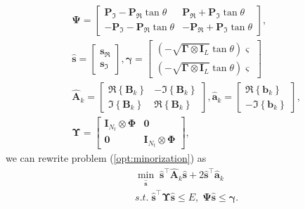 \documentclass[lettersize,journal]{IEEEtran}
\begin{document}
\begin{equation}
\begin{aligned}
    &\mathbf{\Psi} =
    \begin{bmatrix}
        \mathbf{P}_{\Im}-\mathbf{P}_{\Re}\tan\theta & \mathbf{P}_{\Re}+\mathbf{P}_{\Im}\tan\theta \\
        -\mathbf{P}_{\Im}-\mathbf{P}_{\Re}\tan\theta & -\mathbf{P}_{\Re}+\mathbf{P}_{\Im}\tan\theta
    \end{bmatrix}, \\
    &\hat{\mathbf{s}} = 
    \begin{bmatrix}
        \mathbf{s}_{\Re}\\
        \mathbf{s}_{\Im}
    \end{bmatrix},
    \bm{\gamma} = 
    \begin{bmatrix}
        (-\sqrt{\mathbf{\Gamma}\otimes\mathbf{I}_L}\tan\theta)\bm{\varsigma}\\
        (-\sqrt{\mathbf{\Gamma}\otimes\mathbf{I}_L}\tan\theta)\bm{\varsigma}
    \end{bmatrix} \\
    &\hat{\mathbf{A}}_{k} =
    \begin{bmatrix}
        \Re\left\{\mathbf{B}_{k}\right\} & -\Im\left\{\mathbf{B}_{k}\right\} \\
        \Im\left\{\mathbf{B}_{k}\right\} & \Re\left\{\mathbf{B}_{k}\right\}
    \end{bmatrix}, 
    \hat{\mathbf{a}}_{k} =
    \begin{bmatrix}
        \Re\left\{\mathbf{b}_{k}\right\} \\
        -\Im\left\{\mathbf{b}_{k}\right\}
    \end{bmatrix}, \\
    &\mathbf{\Upsilon} =
    \begin{bmatrix}
        \mathbf{I}_{N_t}\otimes\mathbf{\Phi} & \mathbf{0} \\
        \mathbf{0} & \mathbf{I}_{N_t}\otimes\mathbf{\Phi}
    \end{bmatrix}, 
\end{aligned}
\end{equation}
we can rewrite problem (\ref{opt:minorization}) as
\begin{equation}
\label{opt:real_origin}
\begin{aligned}
    &\underset{\hat{\mathbf{s}}}{\min} \;
    \hat{\mathbf{s}}^{\top}\hat{\mathbf{A}}_{k}\hat{\mathbf{s}} + 2\hat{\mathbf{s}}^{\top}\hat{\mathbf{a}}_{k} \\
    &s.t.\;
    \hat{\mathbf{s}}^{\top}\mathbf{\Upsilon}\hat{\mathbf{s}} \leq E, \; \mathbf{\Psi}\hat{\mathbf{s}} \leq \bm{\gamma}.
\end{aligned}
\end{equation}
\end{document}

